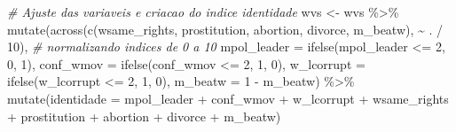 \documentclass[
]{article}
\newenvironment{Shaded}{\begin{snugshade}}{\end{snugshade}}
\newcommand{\AttributeTok}[1]{\textcolor[rgb]{0.77,0.63,0.00}{#1}}
\newcommand{\CommentTok}[1]{\textcolor[rgb]{0.56,0.35,0.01}{\textit{#1}}}
\newcommand{\DecValTok}[1]{\textcolor[rgb]{0.00,0.00,0.81}{#1}}
\newcommand{\FunctionTok}[1]{\textcolor[rgb]{0.00,0.00,0.00}{#1}}
\newcommand{\NormalTok}[1]{#1}
\newcommand{\OtherTok}[1]{\textcolor[rgb]{0.56,0.35,0.01}{#1}}
\newcommand{\SpecialCharTok}[1]{\textcolor[rgb]{0.00,0.00,0.00}{#1}}
\begin{document}
\begin{Shaded}
\begin{Highlighting}[]
\CommentTok{\# Ajuste das variaveis e criacao do indice identidade}
\NormalTok{wvs }\OtherTok{\textless{}{-}}\NormalTok{ wvs }\SpecialCharTok{\%\textgreater{}\%} 
  \FunctionTok{mutate}\NormalTok{(}\FunctionTok{across}\NormalTok{(}\FunctionTok{c}\NormalTok{(wsame\_rights, prostitution, abortion, divorce, m\_beatw), }\SpecialCharTok{\textasciitilde{}}\NormalTok{ . }\SpecialCharTok{/} \DecValTok{10}\NormalTok{), }\CommentTok{\# normalizando indices de 0 a 10}
         \AttributeTok{mpol\_leader =} \FunctionTok{ifelse}\NormalTok{(mpol\_leader }\SpecialCharTok{\textless{}=} \DecValTok{2}\NormalTok{, }\DecValTok{0}\NormalTok{, }\DecValTok{1}\NormalTok{),}
         \AttributeTok{conf\_wmov =} \FunctionTok{ifelse}\NormalTok{(conf\_wmov }\SpecialCharTok{\textless{}=} \DecValTok{2}\NormalTok{, }\DecValTok{1}\NormalTok{, }\DecValTok{0}\NormalTok{),}
         \AttributeTok{w\_lcorrupt =} \FunctionTok{ifelse}\NormalTok{(w\_lcorrupt }\SpecialCharTok{\textless{}=} \DecValTok{2}\NormalTok{, }\DecValTok{1}\NormalTok{, }\DecValTok{0}\NormalTok{),}
         \AttributeTok{m\_beatw =} \DecValTok{1} \SpecialCharTok{{-}}\NormalTok{ m\_beatw) }\SpecialCharTok{\%\textgreater{}\%} 
  \FunctionTok{mutate}\NormalTok{(}\AttributeTok{identidade =}\NormalTok{ mpol\_leader }\SpecialCharTok{+}\NormalTok{ conf\_wmov }\SpecialCharTok{+}\NormalTok{ w\_lcorrupt }\SpecialCharTok{+}\NormalTok{ wsame\_rights }\SpecialCharTok{+}
\NormalTok{                      prostitution }\SpecialCharTok{+}\NormalTok{ abortion }\SpecialCharTok{+}\NormalTok{ divorce }\SpecialCharTok{+}\NormalTok{ m\_beatw) }


\end{Highlighting}
\end{Shaded}
\end{document}
